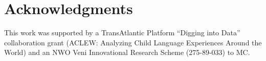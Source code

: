 \documentclass[10pt,letterpaper]{article}
\begin{document}
\section{Acknowledgments}
This work was supported by a TransAtlantic Platform ``Digging into Data'' collaboration grant (ACLEW: Analyzing Child Language Experiences Around the World) and an NWO Veni Innovational Research Scheme (275-89-033) to MC.




\setlength{\bibleftmargin}{.125in}
\setlength{\bibindent}{-\bibleftmargin}


\end{document}
